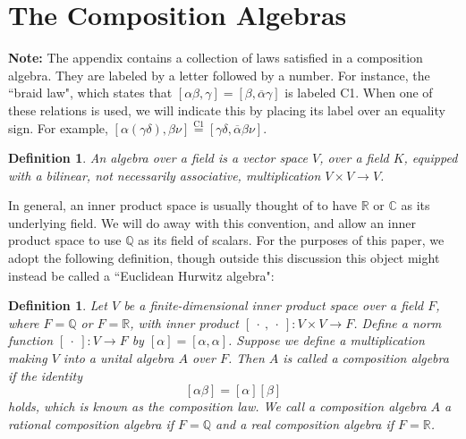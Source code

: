 \documentclass[10pt]{amsart}
\newcommand{\Q}{\mathbb{Q}}
\newcommand{\R}{\mathbb{R}}
\newcommand{\C}{\mathbb{C}}
\renewcommand{\bar}{\overline}
\newcommand{\norm}[1]{\left[#1\right]}
\newtheorem{defn}[thm]{Definition}
\begin{document}

\section{The Composition Algebras}

\noindent
\textbf{Note:} The appendix contains a collection of laws satisfied in a composition algebra.  They are labeled by a letter followed by a number.  For instance, the ``braid law", which states that $\norm{\alpha\beta, \gamma} = \norm{\beta, \bar{\alpha}\gamma}$ is labeled C1.  When one of these relations is used, we will indicate this by placing its label over an equality sign.  For example, $\norm{\alpha(\gamma\delta),\beta\nu} \overset{\text{C1}}{=} \norm{\gamma\delta, \bar{\alpha}\beta\nu}$.

\begin{defn}
\normalfont
An \emph{algebra over a field} is a vector space $V$, over a field $K$, equipped with a bilinear, not necessarily associative, multiplication $V \times V \rightarrow V$.
\end{defn}

In general, an inner product space is usually thought of to have $\R$ or $\C$ as its underlying field.  We will do away with this convention, and allow an inner product space to use $\Q$ as its field of scalars.  For the purposes of this paper, we adopt the following definition, though outside this discussion this object might instead be called a ``Euclidean Hurwitz algebra":

\begin{defn} \label{def:comp}
\normalfont
Let $V$ be a finite-dimensional inner product space over a field $F$, where $F = \Q$ or $F = \R$, with inner product $\norm{\ \cdot \ ,\ \cdot \ } : V \times V \rightarrow F$.  Define a \emph{norm} function $\norm{\ \cdot \ } : V \rightarrow F$ by $\norm{\alpha} = \norm{\alpha,\alpha}$.  Suppose we define a multiplication making $V$ into a unital algebra $A$ over $F$.  Then $A$ is called a \emph{composition algebra} if the identity
$$
\norm{\alpha \beta} = \norm{\alpha}\norm{\beta}
$$
holds, which is known as the \emph{composition law}.  We call a composition algebra $A$ a \emph{rational composition algebra} if $F = \Q$ and a \emph{real composition algebra} if $F = \R$.
\end{defn}
\end{document}

